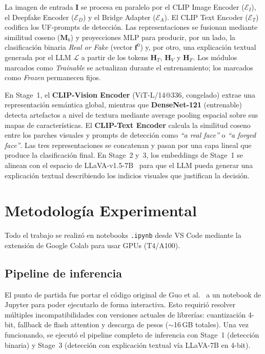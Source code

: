 \documentclass[pdflatex,sn-mathphys-num]{sn-jnl}
\begin{document}
La imagen de entrada \textbf{I} se procesa en paralelo por el CLIP Image Encoder ($\mathcal{E}_I$), el Deepfake Encoder ($\mathcal{E}_D$) y el Bridge Adapter ($\mathcal{E}_A$). El CLIP Text Encoder ($\mathcal{E}_T$) codifica los UF-prompts de detección. Las representaciones se fusionan mediante similitud coseno ($\mathbf{M}_b$) y proyecciones MLP para producir, por un lado, la clasificación binaria \textit{Real or Fake} (vector $\mathbf{f}^0$) y, por otro, una explicación textual generada por el LLM $\mathcal{L}$ a partir de los tokens $\mathbf{H}_T$, $\mathbf{H}_V$ y $\mathbf{H}_F$. Los módulos marcados como \emph{Trainable} se actualizan durante el entrenamiento; los marcados como \emph{Frozen} permanecen fijos.

En Stage~1, el \textbf{CLIP-Vision Encoder} (ViT-L/14@336, congelado) extrae una representación semántica global, mientras que \textbf{DenseNet-121} (entrenable) detecta artefactos a nivel de textura mediante average pooling espacial sobre sus mapas de características. El \textbf{CLIP-Text Encoder} calcula la similitud coseno entre los parches visuales y prompts de detección como \textit{``a real face''} o \textit{``a forged face''}. Las tres representaciones se concatenan y pasan por una capa lineal que produce la clasificación final. En Stage~2 y~3, los embeddings de Stage~1 se alinean con el espacio de LLaVA-v1.5-7B~\cite{liu2023llava} para que el LLM pueda generar una explicación textual describiendo los indicios visuales que justifican la decisión.


\section{Metodología Experimental}\label{sec:methodology}

Todo el trabajo se realizó en notebooks \texttt{.ipynb} desde VS Code mediante la extensión de Google Colab para usar GPUs (T4/A100).

\subsection{Pipeline de inferencia}\label{subsec:colab}

El punto de partida fue portar el código original de Guo et al.~\cite{guo2025m2f2det} a un notebook de Jupyter para poder ejecutarlo de forma interactiva. Esto requirió resolver múltiples incompatibilidades con versiones actuales de librerías: cuantización 4-bit, fallback de flash attention y descarga de pesos (${\sim}$16\,GB totales). Una vez funcionando, se ejecutó el pipeline completo de inferencia con Stage~1 (detección binaria) y Stage~3 (detección con explicación textual vía LLaVA-7B en 4-bit).
\end{document}
